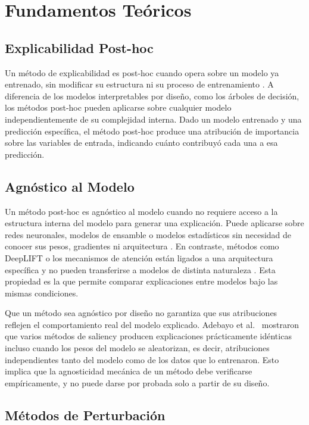 \documentclass[conference, letterpaper]{IEEEtran}
\begin{document}
\section{Fundamentos Teóricos}
\label{sec:fundamentos}

\subsection{Explicabilidad Post-hoc}

Un método de explicabilidad es post-hoc cuando opera sobre un modelo ya entrenado, sin modificar su estructura ni su proceso de entrenamiento \cite{arsenault2025}. A diferencia de los modelos interpretables por diseño, como los árboles de decisión, los métodos post-hoc pueden aplicarse sobre cualquier modelo independientemente de su complejidad interna. Dado un modelo entrenado y una predicción específica, el método post-hoc produce una atribución de importancia sobre las variables de entrada, indicando cuánto contribuyó cada una a esa predicción.


\subsection{Agnóstico al Modelo}

Un método post-hoc es agnóstico al modelo cuando no requiere acceso a la estructura interna del modelo para generar una explicación. Puede aplicarse sobre redes neuronales, modelos de ensamble o modelos estadísticos sin necesidad de conocer sus pesos, gradientes ni arquitectura \cite{arsenault2025}. En contraste, métodos como DeepLIFT o los mecanismos de atención están ligados a una arquitectura específica y no pueden transferirse a modelos de distinta naturaleza \cite{schlegel2019}. Esta propiedad es la que permite comparar explicaciones entre modelos bajo las mismas condiciones.

Que un método sea agnóstico por diseño no garantiza que sus atribuciones reflejen el comportamiento real del modelo explicado. Adebayo et al.~\cite{adebayo2018} mostraron que varios métodos de saliency producen explicaciones prácticamente idénticas incluso cuando los pesos del modelo se aleatorizan, es decir, atribuciones independientes tanto del modelo como de los datos que lo entrenaron. Esto implica que la agnosticidad mecánica de un método debe verificarse empíricamente, y no puede darse por probada solo a partir de su diseño.


\subsection{Métodos de Perturbación}
\end{document}
